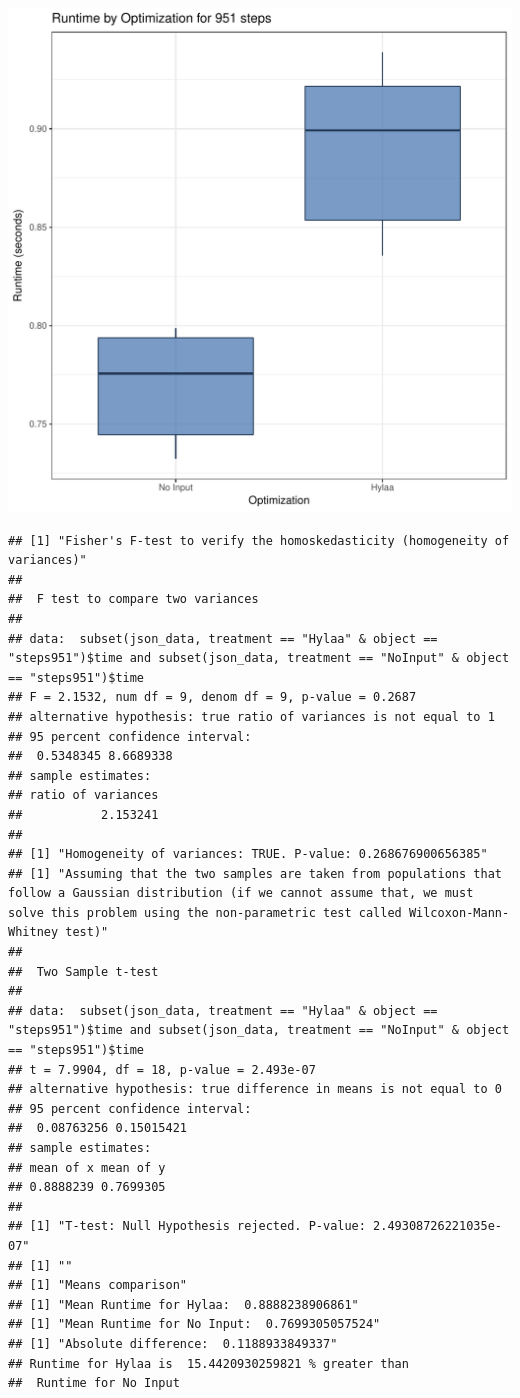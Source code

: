 \documentclass{article}\usepackage[]{graphicx}\usepackage[]{color}
\makeatletter
\def\maxwidth{ %
  \ifdim\Gin@nat@width>\linewidth
    \linewidth
  \else
    \Gin@nat@width
  \fi
}
\newenvironment{kframe}{%
 \def\at@end@of@kframe{}%
 \ifinner\ifhmode%
  \def\at@end@of@kframe{\end{minipage}}%
  \begin{minipage}{\columnwidth}%
 \fi\fi%
 \def\FrameCommand##1{\hskip\@totalleftmargin \hskip-\fboxsep
 \colorbox{shadecolor}{##1}\hskip-\fboxsep
     \hskip-\linewidth \hskip-\@totalleftmargin \hskip\columnwidth}%
 \MakeFramed {\advance\hsize-\width
   \@totalleftmargin\z@ \linewidth\hsize
   \@setminipage}}%
 {\par\unskip\endMakeFramed%
 \at@end@of@kframe}
\newenvironment{knitrout}{}{} %
\makeatother
\begin{document}
\begin{knitrout}
\color{fgcolor}
\includegraphics[width=\maxwidth]{figure/RH4_steps951-1} 
\begin{kframe}\begin{verbatim}
## [1] "Fisher's F-test to verify the homoskedasticity (homogeneity of variances)"
## 
## 	F test to compare two variances
## 
## data:  subset(json_data, treatment == "Hylaa" & object == "steps951")$time and subset(json_data, treatment == "NoInput" & object == "steps951")$time
## F = 2.1532, num df = 9, denom df = 9, p-value = 0.2687
## alternative hypothesis: true ratio of variances is not equal to 1
## 95 percent confidence interval:
##  0.5348345 8.6689338
## sample estimates:
## ratio of variances 
##           2.153241 
## 
## [1] "Homogeneity of variances: TRUE. P-value: 0.268676900656385"
## [1] "Assuming that the two samples are taken from populations that follow a Gaussian distribution (if we cannot assume that, we must solve this problem using the non-parametric test called Wilcoxon-Mann-Whitney test)"
## 
## 	Two Sample t-test
## 
## data:  subset(json_data, treatment == "Hylaa" & object == "steps951")$time and subset(json_data, treatment == "NoInput" & object == "steps951")$time
## t = 7.9904, df = 18, p-value = 2.493e-07
## alternative hypothesis: true difference in means is not equal to 0
## 95 percent confidence interval:
##  0.08763256 0.15015421
## sample estimates:
## mean of x mean of y 
## 0.8888239 0.7699305 
## 
## [1] "T-test: Null Hypothesis rejected. P-value: 2.49308726221035e-07"
## [1] ""
## [1] "Means comparison"
## [1] "Mean Runtime for Hylaa:  0.8888238906861"
## [1] "Mean Runtime for No Input:  0.7699305057524"
## [1] "Absolute difference:  0.1188933849337"
## Runtime for Hylaa is  15.4420930259821 % greater than 
##  Runtime for No Input
\end{verbatim}
\end{kframe}
\end{knitrout}
\end{document}
